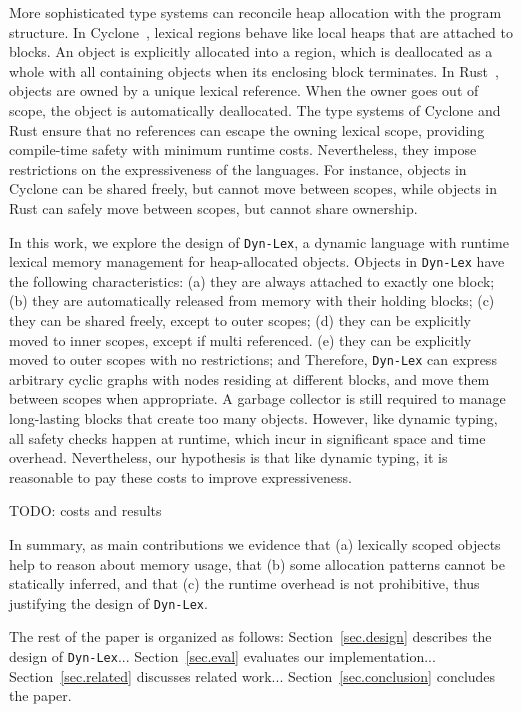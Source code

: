 \documentclass[12pt]{article}
\newcommand{\lex} {\texttt{Dyn-Lex}\xspace}
\begin{document}
More sophisticated type systems can reconcile heap allocation with the program
structure.
%
In Cyclone~\cite{cyclone.regions}, lexical regions behave like local heaps that
are attached to blocks.
An object is explicitly allocated into a region, which is deallocated as a
whole with all containing objects when its enclosing block terminates.
%
In Rust~\cite{rust.book}, objects are owned by a unique lexical reference.
When the owner goes out of scope, the object is automatically deallocated.
%
The type systems of Cyclone and Rust ensure that no references can escape the
owning lexical scope, providing compile-time safety with minimum runtime
costs.
%
Nevertheless, they impose restrictions on the expressiveness of the languages.
For instance, objects in Cyclone can be shared freely, but cannot move between
scopes, while objects in Rust can safely move between scopes, but cannot share
ownership.

In this work, we explore the design of \lex, a dynamic language with runtime
lexical memory management for heap-allocated objects.
%
Objects in \lex have the following characteristics:
    (a) they are always attached to exactly one block;
    (b) they are automatically released from memory with their holding blocks;
    (c) they can be shared freely, except to outer scopes;
    (d) they can be explicitly moved to inner scopes, except if multi
        referenced.
    (e) they can be explicitly moved to outer scopes with no restrictions; and
%
Therefore, \lex can express arbitrary cyclic graphs with nodes residing at
different blocks, and move them between scopes when appropriate.
A garbage collector is still required to manage long-lasting blocks that create
too many objects.
%
However, like dynamic typing, all safety checks happen at runtime, which incur
in significant space and time overhead.
Nevertheless, our hypothesis is that like dynamic typing, it is reasonable to
pay these costs to improve expressiveness.

TODO: costs and results

In summary, as main contributions we evidence that
(a) lexically scoped objects help to reason about memory usage, that
(b) some allocation patterns cannot be statically inferred, and that
(c) the runtime overhead is not prohibitive, thus justifying the design of
    \lex.

The rest of the paper is organized as follows:
Section~\ref{sec.design} describes the design of \lex...
Section~\ref{sec.eval} evaluates our implementation...
Section~\ref{sec.related} discusses related work...
Section~\ref{sec.conclusion} concludes the paper.
\end{document}
